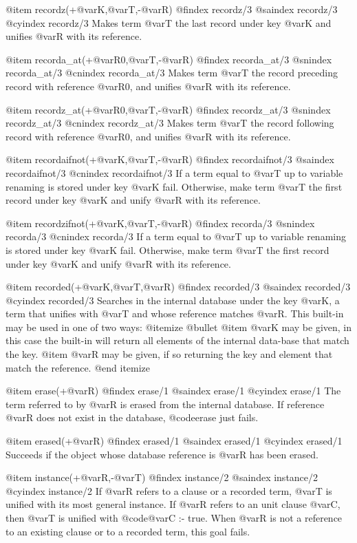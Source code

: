 {{{{{@item recordz(+@var{K},@var{T},-@var{R})
@findex recordz/3
@saindex recordz/3
@cyindex recordz/3
Makes term @var{T} the last record under key @var{K} and unifies @var{R}
with its reference.

@item recorda_at(+@var{R0},@var{T},-@var{R})
@findex recorda_at/3
@snindex recorda_at/3
@cnindex recorda_at/3
Makes term @var{T} the record preceding record with reference
@var{R0}, and unifies @var{R} with its reference.

@item recordz_at(+@var{R0},@var{T},-@var{R})
@findex recordz_at/3
@snindex recordz_at/3
@cnindex recordz_at/3
Makes term @var{T} the record following record with reference
@var{R0}, and unifies @var{R} with its reference.

@item recordaifnot(+@var{K},@var{T},-@var{R})
@findex recordaifnot/3
@saindex recordaifnot/3
@cnindex recordaifnot/3
If a term equal to @var{T} up to variable renaming is stored under key
@var{K} fail. Otherwise, make term @var{T} the first record under key
@var{K} and unify @var{R} with its reference.

@item recordzifnot(+@var{K},@var{T},-@var{R})
@findex recorda/3
@snindex recorda/3
@cnindex recorda/3
If a term equal to @var{T} up to variable renaming is stored under key
@var{K} fail. Otherwise, make term @var{T} the first record under key
@var{K} and unify @var{R} with its reference.

@item recorded(+@var{K},@var{T},@var{R})
@findex recorded/3
@saindex recorded/3
@cyindex recorded/3
Searches in the internal database under the key @var{K}, a term that
unifies with @var{T} and whose reference matches @var{R}. This
built-in may be used in one of two ways:
@itemize @bullet
@item @var{K} may be given, in this case the built-in will return all
elements of the internal data-base that match the key.
@item @var{R} may be given, if so returning the key and element that
match the reference.
@end itemize

@item erase(+@var{R})
@findex erase/1
@saindex erase/1
@cyindex erase/1
The term referred to by @var{R} is erased from the internal database. If
reference @var{R} does not exist in the database, @code{erase} just fails.

@item erased(+@var{R})
@findex erased/1
@saindex erased/1
@cyindex erased/1
Succeeds if the object whose database reference is @var{R} has been
erased.

@item instance(+@var{R},-@var{T})
@findex instance/2
@saindex instance/2
@cyindex instance/2
If @var{R} refers to a clause or a recorded term, @var{T} is unified
with its most general instance. If @var{R} refers to an unit clause
@var{C}, then @var{T} is unified with @code{@var{C} :- true}. When
@var{R} is not a reference to an existing clause or to a recorded term,
this goal fails.

}}}}}
